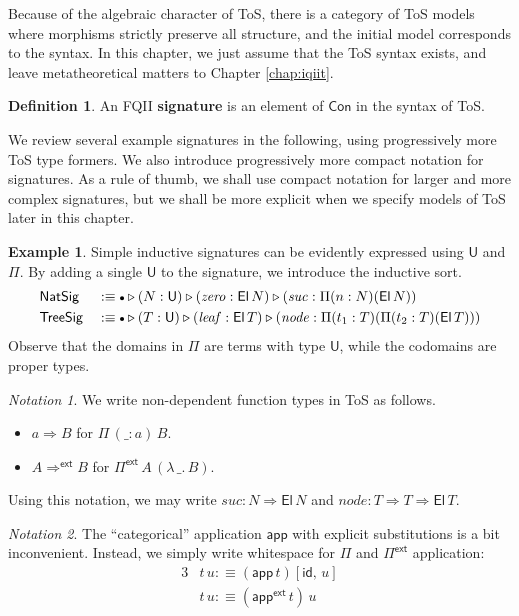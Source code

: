 \documentclass[12pt,a4paper,twoside,openany]{book}
\theoremstyle{remark}
\newtheorem{notation}{Notation}
\theoremstyle{definition}
\newtheorem{mydefinition}{Definition}
\newtheorem{myexample}{Example}
\theoremstyle{theorem}
\newcommand{\mi}[1]{\mathit{#1}}
\newcommand{\ms}[1]{\mathsf{#1}}
\newcommand{\id}{\mathsf{id}}
\newcommand{\Con}{\mathsf{Con}}
\newcommand{\U}{\mathsf{U}}
\newcommand{\El}{\mathsf{El}}
\newcommand{\ext}{\triangleright}
\newcommand{\emptycon}{\scaleobj{.75}\bullet}
\newcommand{\Pii}{\Pi}
\newcommand{\funi}{\Rightarrow}
\newcommand{\fune}{\Rightarrow^{\ms{ext}}}
\newcommand{\appi}{\mathsf{app}}
\newcommand{\Pie}{\Pi^{\mathsf{ext}}}
\newcommand{\appe}{\mathsf{app^{ext}}}
\newcommand{\app}{\ms{app}}
\newcommand{\defn}{:\equiv}
\begin{document}
Because of the algebraic character of ToS, there is a category of ToS models
where morphisms strictly preserve all structure, and the initial model
corresponds to the syntax. In this chapter, we just assume that the ToS
syntax exists, and leave metatheoretical matters to Chapter \ref{chap:iqiit}.
\begin{mydefinition} An FQII \textbf{signature} is an element of $\Con$ in the syntax of ToS.
\end{mydefinition}
We review several example signatures in the following, using progressively
more ToS type formers.  We also introduce progressively more compact notation
for signatures. As a rule of thumb, we shall use compact notation for larger and
more complex signatures, but we shall be more explicit when we specify models of
ToS later in this chapter.
\begin{myexample}
  Simple inductive signatures can be evidently expressed using $\U$ and
  $\Pi$. By adding a single $\U$ to the signature, we introduce the inductive
  sort.
  \begin{alignat*}{3}
    & \ms{NatSig} &&\defn \emptycon \ext (N : \U) \ext (\mi{zero} : \El\,N)
                        \ext (\mi{suc} : \Pi (n : N) (\El\,N))\\
    & \ms{TreeSig} &&\defn \emptycon \ext (T : \U) \ext (\mi{leaf} : \El\,T)
                         \ext (\mi{node} : \Pi (t_1 : T) (\Pi (t_2 : T) (\El\,T)))
  \end{alignat*}
  Observe that the domains in $\Pi$ are terms with type $\U$, while the codomains are proper types.
\end{myexample}

\begin{notation} We write non-dependent function types in ToS as follows.
  \begin{itemize}
  \item $a \funi B$ for $\Pi\,(\_ : a)\,B$.
  \item $A \fune B$ for $\Pie\,A\,(\lambda\,\_.\,B)$.
  \end{itemize}
\end{notation}
\noindent
Using this notation, we may write $\mi{suc} : N \funi \El\,N$ and $\mi{node} : T
\funi T \funi \El\,T$.

\begin{notation}
The ``categorical'' application $\app$ with explicit substitutions is a bit
inconvenient. Instead, we simply write whitespace for $\Pii$ and $\Pie$
application:
\begin{alignat*}{3}
  & t\,u \defn (\appi\,t)[\id,\,u]\\
  & t\,u \defn (\appe\,t)\,u
\end{alignat*}
\end{notation}
\end{document}
